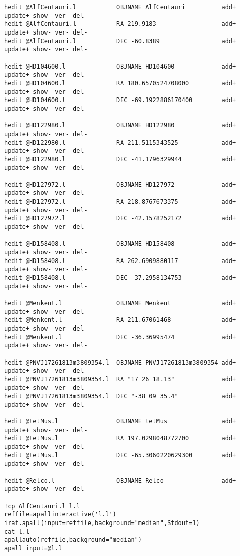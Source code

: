 \begin{verbatim}
hedit @AlfCentauri.l           OBJNAME AlfCentauri          add+ update+ show- ver- del-
hedit @AlfCentauri.l           RA 219.9183                  add+ update+ show- ver- del-
hedit @AlfCentauri.l           DEC -60.8389                 add+ update+ show- ver- del-

hedit @HD104600.l              OBJNAME HD104600             add+ update+ show- ver- del-
hedit @HD104600.l              RA 180.6570524708000         add+ update+ show- ver- del-
hedit @HD104600.l              DEC -69.1922886170400        add+ update+ show- ver- del-

hedit @HD122980.l              OBJNAME HD122980             add+ update+ show- ver- del-
hedit @HD122980.l              RA 211.5115343525            add+ update+ show- ver- del-
hedit @HD122980.l              DEC -41.1796329944           add+ update+ show- ver- del-

hedit @HD127972.l              OBJNAME HD127972             add+ update+ show- ver- del-
hedit @HD127972.l              RA 218.8767673375            add+ update+ show- ver- del-
hedit @HD127972.l              DEC -42.1578252172           add+ update+ show- ver- del-

hedit @HD158408.l              OBJNAME HD158408             add+ update+ show- ver- del-
hedit @HD158408.l              RA 262.6909880117            add+ update+ show- ver- del-
hedit @HD158408.l              DEC -37.2958134753           add+ update+ show- ver- del-

hedit @Menkent.l               OBJNAME Menkent              add+ update+ show- ver- del- 
hedit @Menkent.l               RA 211.67061468              add+ update+ show- ver- del-
hedit @Menkent.l               DEC -36.36995474             add+ update+ show- ver- del-

hedit @PNVJ17261813m3809354.l  OBJNAME PNVJ17261813m3809354 add+ update+ show- ver- del- 
hedit @PNVJ17261813m3809354.l  RA "17 26 18.13"             add+ update+ show- ver- del-
hedit @PNVJ17261813m3809354.l  DEC "-38 09 35.4"            add+ update+ show- ver- del-

hedit @tetMus.l                OBJNAME tetMus               add+ update+ show- ver- del-
hedit @tetMus.l                RA 197.0298048772700         add+ update+ show- ver- del-
hedit @tetMus.l                DEC -65.3060220629300        add+ update+ show- ver- del-

hedit @Relco.l                 OBJNAME Relco                add+ update+ show- ver- del- 

!cp AlfCentauri.l l.l
reffile=apallinteractive('l.l')
iraf.apall(input=reffile,background="median",Stdout=1)
cat l.l
apallauto(reffile,background="median")
apall input=@l.l


\end{verbatim}
